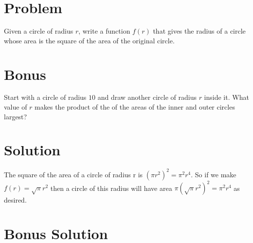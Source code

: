 \documentclass[11pt,a4paper]{report}
\theoremstyle{plain}
\theoremstyle{definition}
\theoremstyle{remark}
\begin{document}
\section*{Problem}
Given a circle of radius $r$, write a function $f(r)$ that gives the radius of a circle whose area is the square of the area of the original circle.

\section*{Bonus}
Start with a circle of radius $10$ and draw another circle of radius $r$ inside it.  What value of $r$ makes the product of the of the areas of the inner and outer circles largest?

\newpage
\section*{Solution}
The square of the area of a circle of radius r is $( \pi r^2)^2 = \pi^2r^4$.   So if we make $f(r) = \sqrt{\pi}r^2$ then a circle of this radius will
 have area $\pi(\sqrt{\pi}r^2)^2 = \pi^2r^4$ as desired.

\section*{Bonus Solution}
 
 
\end{document}
